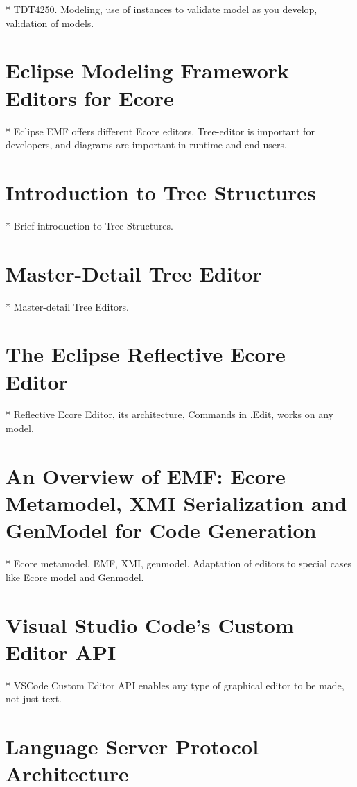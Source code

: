 * TDT4250. Modeling, use of instances to validate model as you develop, validation of models.

\section{Eclipse Modeling Framework Editors for Ecore}

* Eclipse EMF offers different Ecore editors. Tree-editor is important for developers, and diagrams are important in runtime and end-users.

\section{Introduction to Tree Structures}

* Brief introduction to Tree Structures.

\section{Master-Detail Tree Editor}

* Master-detail Tree Editors. 

\section{The Eclipse Reflective Ecore Editor}

* Reflective Ecore Editor, its architecture, Commands in .Edit, works on any model.

\section{An Overview of EMF: Ecore Metamodel, XMI Serialization and GenModel for Code Generation}

* Ecore metamodel, EMF, XMI, genmodel. Adaptation of editors to special cases like Ecore model and Genmodel.

\section{Visual Studio Code's Custom Editor API}

* VSCode Custom Editor API enables any type of graphical editor to be made, not just text.

\section{Language Server Protocol Architecture}

